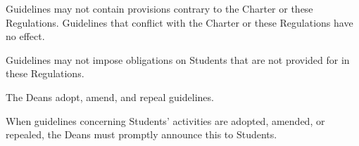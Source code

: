 \begin{articles}
  \begin{paragraphs}
    \item Guidelines may not contain provisions contrary to the Charter or these Regulations. Guidelines that conflict with the Charter or these Regulations have no effect.
    \item Guidelines may not impose obligations on Students that are not provided for in these Regulations.
    \item The Deans adopt, amend, and repeal guidelines.
    \item When guidelines concerning Students' activities are adopted, amended, or repealed, the Deans must promptly announce this to Students.
  \end{paragraphs}
\end{articles}
